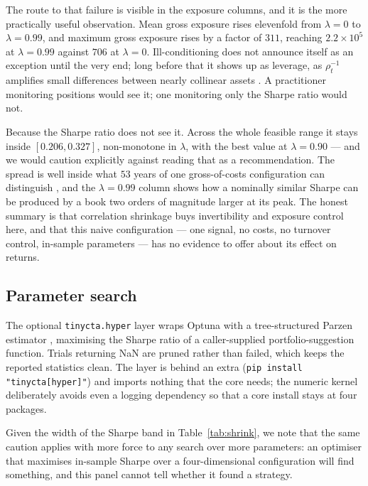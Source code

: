 \documentclass[11pt,a4paper]{article}
\newcommand{\code}[1]{\texttt{#1}}
\begin{document}
The route to that failure is visible in the exposure columns, and it is the more
practically useful observation. Mean gross exposure rises elevenfold from
$\lambda = 0$ to $\lambda = 0.99$, and maximum gross exposure rises by a factor
of $311$, reaching $2.2 \times 10^5$ at $\lambda = 0.99$ against $706$ at
$\lambda = 0$. Ill-conditioning does not announce itself as an exception until
the very end; long before that it shows up as leverage, as
$\rho_t^{-1}$ amplifies small differences between nearly collinear assets
\citep{michaud1989}. A practitioner monitoring positions would see it; one
monitoring only the Sharpe ratio would not.

Because the Sharpe ratio does not see it. Across the whole feasible range it
stays inside $[0.206, 0.327]$, non-monotone in $\lambda$, with the best value at
$\lambda = 0.90$ --- and we would caution explicitly against reading that as a
recommendation. The spread is well inside what $53$ years of one gross-of-costs
configuration can distinguish \citep{harvey2018}, and the $\lambda = 0.99$
column shows how a nominally similar Sharpe can be produced by a book two orders
of magnitude larger at its peak. The honest summary is that correlation shrinkage
buys invertibility and exposure control here, and that this naive configuration
--- one signal, no costs, no turnover control, in-sample parameters --- has no
evidence to offer about its effect on returns.

\subsection{Parameter search}

The optional \code{tinycta.hyper} layer wraps Optuna \citep{akiba2019} with a
tree-structured Parzen estimator \citep{bergstra2011}, maximising the Sharpe
ratio of a caller-supplied portfolio-suggestion function. Trials returning NaN
are pruned rather than failed, which keeps the reported statistics clean. The
layer is behind an extra (\code{pip install "tinycta[hyper]"}) and imports
nothing that the core needs; the numeric kernel deliberately avoids even a
logging dependency so that a core install stays at four packages.

Given the width of the Sharpe band in Table~\ref{tab:shrink}, we note that the
same caution applies with more force to any search over more parameters: an
optimiser that maximises in-sample Sharpe over a four-dimensional configuration
will find something, and this panel cannot tell whether it found a strategy.
\end{document}
